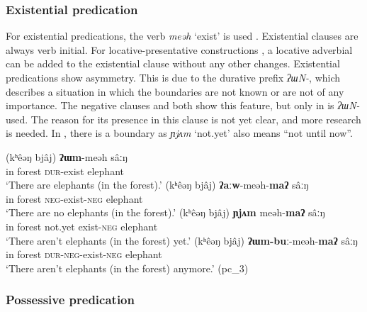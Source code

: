 \documentclass[output=paper,colorlinks,citecolor=brown]{langscibook}
\begin{document}
\subsubsection{Existential predication} \label{sec:rum:2.3.5}

For existential predications, the verb \textit{meəh} ‘exist’ is used . Existential clauses are always verb initial. For locative-presentative constructions \citep[108]{Veselinova2013neg.exist}, a locative adverbial can be added to the existential clause without any other changes. Existential predications show asymmetry. This is due to the durative prefix \textit{ʔɯN-}, which describes a situation in which the boundaries are not known or are not of any importance. The negative clauses  and  both show this feature, but only in  is \textit{ʔɯN-} used. The reason for its presence in this clause is not yet clear, and more research is needed. In , there is a boundary as \textit{ɲjʌm} ‘not.yet' also means “not until now”.

\ea\label{ex:rum:43} 
    \ea\label{ex:rum:43a}
        \gll (kʰêəŋ	bjâj)	\textbf{ʔɯm}-meəh	sâːŋ \\ 
             in forest \textsc{dur}{}-exist elephant \\
        \glt ‘There are elephants (in the forest).’
    \ex\label{ex:rum:43b}
        \gll (kʰêəŋ	bjâj)	\textbf{ʔaːw}-meəh-\textbf{maʔ}	sâːŋ \\
             in forest \textsc{neg}{}-exist-\textsc{neg} elephant \\
        \glt ‘There are no elephants (in the forest).’
    \ex\label{ex:rum:43c}
        \gll (kʰêəŋ	bjâj)	\textbf{ɲjʌm}	meəh-\textbf{maʔ}	sâːŋ \\
             in forest not.yet exist-\textsc{neg} elephant \\
        \glt ‘There aren't elephants (in the forest) yet.’
    \ex\label{ex:rum:43d}
        \gll (kʰêəŋ	bjâj)	\textbf{ʔɯm-buː}-meəh-\textbf{maʔ}	sâːŋ \\
             in forest \textsc{dur}{}-\textsc{neg}{}-exist-\textsc{neg} elephant \\
        \glt ‘There aren't elephants (in the forest) anymore.’ (pc\_3)
    \z
\z 

\subsubsection{Possessive predication} \label{sec:rum:2.3.6}
\end{document}
